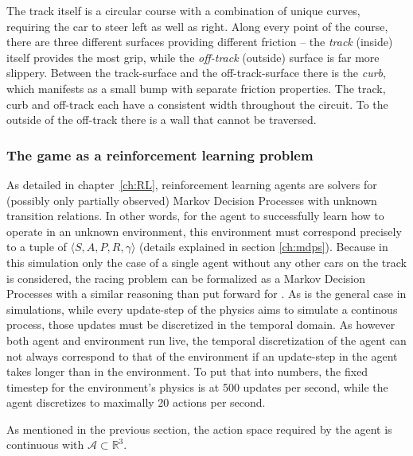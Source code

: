 The track itself is a circular course with a combination of unique curves, requiring the car to steer left as well as right. Along every point of the course, there are three different surfaces providing different friction -- the \textit{track} (inside) itself provides the most grip, while the \textit{off-track} (outside) surface is far more slippery. Between the track-surface and the off-track-surface there is the \textit{curb}, which manifests as a small bump with separate friction properties. The track, curb and off-track each have a consistent width throughout the circuit. To the outside of the off-track there is a wall that cannot be traversed.

\subsubsection{The game as a reinforcement learning problem}

As detailed in chapter~\ref{ch:RL}, reinforcement learning agents are solvers for (possibly only partially observed) Markov Decision Processes with unknown transition relations. In other words, for the agent to successfully learn how to operate in an unknown environment, this environment must correspond precisely to a tuple of $\langle S, A, P, R, \gamma \rangle$ (details explained in section \ref{ch:mdps}). Because in this simulation only the case of a single agent without any other cars on the track is considered, the racing problem can be formalized as a Markov Decision Processes with a similar reasoning than \citet[chapter 4]{wymann_torcs_2000} put forward for . As is the general case in simulations, while every update-step of the physics aims to simulate a continous process, those updates must be discretized in the temporal domain. As however both agent and environment run live, the temporal discretization of the agent can not always correspond to that of the environment if an update-step in the agent takes longer than in the environment. To put that into numbers, the fixed timestep for the environment's physics is at 500 updates per second, while the agent discretizes to maximally 20 actions per second.

As mentioned in the previous section, the action space required by the agent is continuous with $\mathcal{A} \subset \mathds{R}^3$. 

